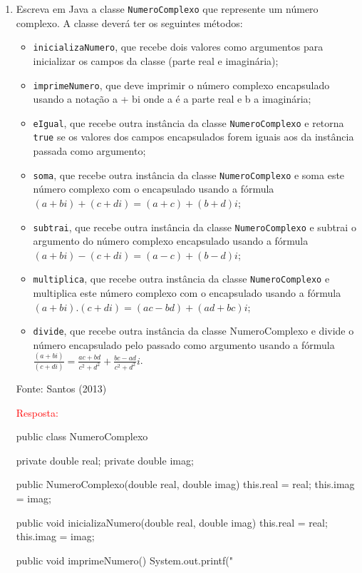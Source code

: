 \documentclass[onecolumn,a4paper,10pt]{report}
\newcommand{\+}{\, + \,}
\newcommand{\<}{\hspace*{-0.4cm}}
\begin{document}
\begin{enumerate}
\item Escreva em Java a classe \texttt{NumeroComplexo} que represente um número complexo. A classe deverá ter os seguintes métodos:
\begin{itemize}
	\item \texttt{inicializaNumero}, que recebe dois valores como argumentos para inicializar os campos da classe (parte real e imaginária);
	\item \texttt{imprimeNumero}, que deve imprimir o número complexo encapsulado usando a notação a + bi onde a é a parte real e b a imaginária;
	\item \texttt{eIgual}, que recebe outra instância da classe \texttt{NumeroComplexo} e retorna \texttt{true} se os valores dos campos encapsulados forem iguais aos da instância passada como argumento;
	\item \texttt{soma}, que recebe outra instância da classe \texttt{NumeroComplexo} e soma este número complexo com o encapsulado usando a fórmula $(a + bi) + (c + di) = (a + c) + (b + d)i$;
	\item \texttt{subtrai}, que recebe outra instância da classe \texttt{NumeroComplexo} e subtrai o argumento do número complexo encapsulado usando a fórmula $(a + bi) - (c + di) = (a - c) + (b - d)i$;
	\item \texttt{multiplica}, que recebe outra instância da classe \texttt{NumeroComplexo} e multiplica este número complexo com o encapsulado usando a fórmula $(a + bi) . (c + di) = (ac - bd) + (ad + bc)i$;
	\item \texttt{divide}, que recebe outra instância da classe NumeroComplexo e divide o número encapsulado pelo passado como argumento usando a fórmula $\frac{(a+bi)}{(c+di)} = \frac{ac+bd}{c^2+d^2} + \frac{bc-ad}{c^2+d^2}i$.
\end{itemize}
{\tiny Fonte: Santos (2013)}\\
{\tiny \textcolor{red}{Resposta:}\\
\begin{javacode}
public class NumeroComplexo {
    private double real;
    private double imag;
    
    public NumeroComplexo(double real, double imag) {
        this.real = real;
        this.imag = imag;
    }
    
    public void inicializaNumero(double real, double imag) {
        this.real = real;
        this.imag = imag;
    }
    
    public void imprimeNumero() {
        System.out.printf("%
    }
    
}
\end{javacode}}
\end{enumerate}
\end{document}
